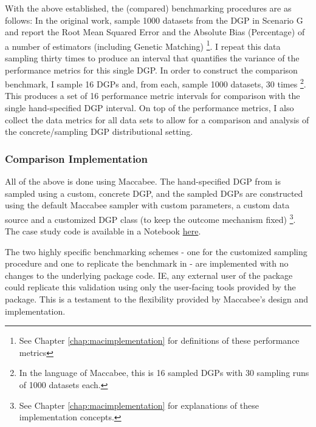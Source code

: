 \documentclass[../main.tex]{subfiles}
\begin{document}
\vspace{\baselineskip}

With the above established, the (compared) benchmarking procedures are as follows: In the original work, \citeauthor{Diamond2013GeneticStudies} sample 1000 datasets from the DGP in Scenario G and report the Root Mean Squared Error and the Absolute Bias (Percentage) of a number of estimators (including Genetic Matching) \footnote{See Chapter \ref{chap:macimplementation} for definitions of these performance metrics}. I repeat this data sampling thirty times to produce an interval that quantifies the variance of the performance metrics for this single DGP. In order to construct the comparison benchmark, I sample 16 DGPs and, from each, sample 1000 datasets, 30 times \footnote{In the language of Maccabee, this is 16 sampled DGPs with 30 sampling runs of 1000 datasets each.}. This produces a set of 16 performance metric intervals for comparison with the single hand-specified DGP interval. On top of the performance metrics, I also collect the data metrics for all data sets to allow for a comparison and analysis of the concrete/sampling DGP distributional setting.

\subsubsection{Comparison Implementation}

All of the above is done using Maccabee. The hand-specified DGP from \textcite{Diamond2013GeneticStudies} is sampled using a custom, concrete DGP, and the sampled DGPs are constructed using the default Maccabee sampler with custom parameters, a custom data source and a customized DGP class (to keep the outcome mechanism fixed) \footnote{See Chapter \ref{chap:macimplementation} for explanations of these implementation concepts.}. The case study code is available in a Notebook \href{https://github.com/JoshBroomberg/Maccabee/blob/master/Notebooks/Genmatch\%20Benchmarking\%20Validation.ipynb}{here}. 

\vspace{\baselineskip}

The two highly specific benchmarking schemes - one for the customized sampling procedure and one to replicate the benchmark in \textcite{Diamond2013GeneticStudies} - are implemented with no changes to the underlying package code. IE, any external user of the package could replicate this validation using only the user-facing tools provided by the package. This is a testament to the flexibility provided by Maccabee's design and implementation.
\end{document}
